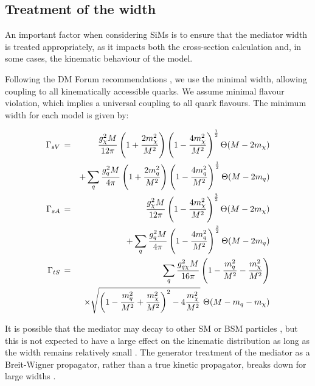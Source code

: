 \subsection{Treatment of the width}
\label{width_effects}
An important factor when considering SiMs is to ensure that the mediator width is treated appropriately, as it impacts both the cross-section calculation and, in some cases, the kinematic behaviour of the model.

Following the DM Forum recommendations \cite{DMForumReport}, we use the minimal width, allowing coupling to all kinematically accessible quarks. We assume minimal flavour violation, which implies a universal coupling to all quark flavours. The minimum  width for each model is given by:

\begin{eqnarray}
    \Gamma_{sV} \, &=& \,  \frac{g_{\chi}^2 M}{12\pi}\left(1 + \frac{2 m_{\chi}^{2}}{M^{2}}\right)\left(1 - \frac{4 m_{\chi}^{2}}{M^{2}}\right)^{\frac{1}{2}} \Theta(M-2 m_{\chi}) \nonumber\\
                  && + \sum_{\substack{q}}\frac{g_q^2M}{4\pi}\left(1 + \frac{2m_{q}^{2}}{M^{2}}\right)\left(1 - \frac{4m_{q}^{2}}{M^{2}}\right)^{\frac{1}{2}} \Theta(M-2m_q)\\
    \Gamma_{sA} \, &=& \,  \frac{g_{\chi}^2 M}{12\pi}\left(1 - \frac{4 m_{\chi}^{2}}{M^{2}}\right)^{\frac{3}{2}} \Theta(M-2 m_{\chi}) \nonumber\\
                  && + \sum_{\substack{q}}\frac{g_q^2 M}{4\pi}\left(1 - \frac{4m_{q}^{2}}{M^{2}}\right)^{\frac{3}{2}} \Theta(M-2m_q) \\
    \Gamma_{tS} \, &=& \,  \sum_{\substack{q}} \frac{g_{q \chi}^2M}{16\pi}\left(1 - \frac{m_{q}^{2}}{M^{2}} - \frac{m_{\chi}^{2}}{M^{2}}\right) \nonumber\\
                  && \times \sqrt{\left(1 - \frac{m_{q}^{2}}{M^{2}} + \frac{m_{\chi}^{2}}{M^{2}}\right)^{2} - 4\frac{m_{\chi}^{2}}{M^{2}}} \,\, \Theta(M-m_q- m_{\chi})
\end{eqnarray}


It is possible that the mediator may decay to other SM or BSM particles \cite{Harris:2014hga}, but this is not expected to have a large effect on the kinematic distribution as long as the width remains relatively small \cite{DMForumReport}.
The generator treatment of the mediator as a Breit-Wigner propagator, rather than a true kinetic propagator, breaks down for large widths \cite{An:2012va,NordstromSVD}.

